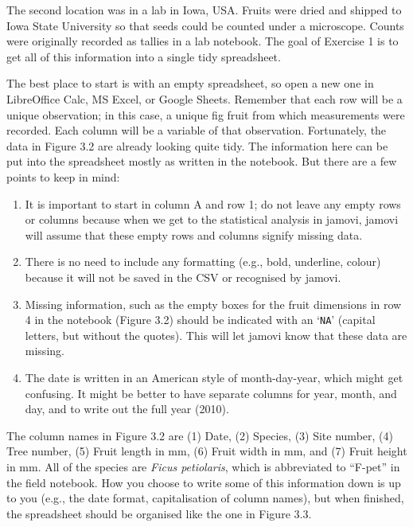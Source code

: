 \documentclass[
  openany]{scrbook}
\providecommand{\tightlist}{%
  \setlength{\itemsep}{0pt}\setlength{\parskip}{0pt}}
\begin{document}
The second location was in a lab in Iowa, USA.
Fruits were dried and shipped to Iowa State University so that seeds could be counted under a microscope.
Counts were originally recorded as tallies in a lab notebook.
The goal of Exercise 1 is to get all of this information into a single tidy spreadsheet.

The best place to start is with an empty spreadsheet, so open a new one in LibreOffice Calc, MS Excel, or Google Sheets.
Remember that each row will be a unique observation; in this case, a unique fig fruit from which measurements were recorded.
Each column will be a variable of that observation.
Fortunately, the data in Figure 3.2 are already looking quite tidy.
The information here can be put into the spreadsheet mostly as written in the notebook.
But there are a few points to keep in mind:

\begin{enumerate}
\def\labelenumi{\arabic{enumi}.}
\tightlist
\item
  It is important to start in column A and row 1; do not leave any empty rows or columns because when we get to the statistical analysis in jamovi, jamovi will assume that these empty rows and columns signify missing data.
\item
  There is no need to include any formatting (e.g., bold, underline, colour) because it will not be saved in the CSV or recognised by jamovi.
\item
  Missing information, such as the empty boxes for the fruit dimensions in row 4 in the notebook (Figure 3.2) should be indicated with an `\texttt{NA}' (capital letters, but without the quotes). This will let jamovi know that these data are missing.
\item
  The date is written in an American style of month-day-year, which might get confusing. It might be better to have separate columns for year, month, and day, and to write out the full year (2010).
\end{enumerate}

The column names in Figure 3.2 are (1) Date, (2) Species, (3) Site number, (4) Tree number, (5) Fruit length in mm, (6) Fruit width in mm, and (7) Fruit height in mm.
All of the species are \emph{Ficus petiolaris}, which is abbreviated to ``F-pet'' in the field notebook.
How you choose to write some of this information down is up to you (e.g., the date format, capitalisation of column names), but when finished, the spreadsheet should be organised like the one in Figure 3.3.
\end{document}
